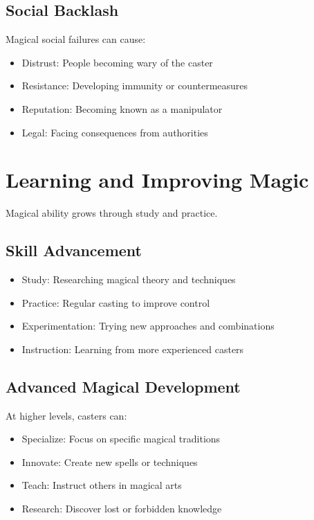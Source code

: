 \documentclass[11pt,twoside,openany]{book}
\begin{document}
\subsection*{Social Backlash}

Magical social failures can cause:
\begin{itemize}
\item Distrust: People becoming wary of the caster
\item Resistance: Developing immunity or countermeasures
\item Reputation: Becoming known as a manipulator
\item Legal: Facing consequences from authorities
\end{itemize}

\section*{Learning and Improving Magic} 

Magical ability grows through study and practice.

\subsection*{Skill Advancement}

\begin{itemize}
\item Study: Researching magical theory and techniques
\item Practice: Regular casting to improve control
\item Experimentation: Trying new approaches and combinations
\item Instruction: Learning from more experienced casters
\end{itemize}

\subsection*{Advanced Magical Development}

At higher levels, casters can:
\begin{itemize}
\item Specialize: Focus on specific magical traditions
\item Innovate: Create new spells or techniques
\item Teach: Instruct others in magical arts
\item Research: Discover lost or forbidden knowledge
\end{itemize}
\end{document}

